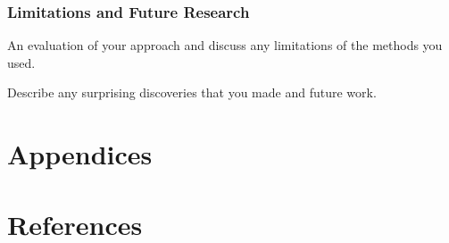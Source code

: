 \documentclass[11pt]{article}
\begin{document}
\subsubsection{Limitations and Future Research}
 An evaluation of your approach and discuss any limitations of the methods you used.

Describe any surprising discoveries that you made and future work.


\section{Appendices}
\section{References}


\end{document}
